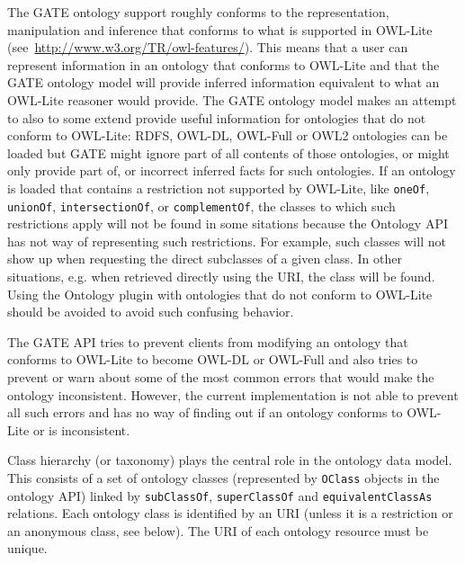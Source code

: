 The GATE ontology support roughly conforms to the representation, 
manipulation and inference that conforms to what is supported in
OWL-Lite (see~\url{http://www.w3.org/TR/owl-features/}).
This means that a user can represent information in an ontology that
conforms to OWL-Lite and that the GATE ontology model will provide
inferred information equivalent to what an OWL-Lite reasoner 
would provide. The GATE ontology model makes an attempt to also
to some extend provide useful information for ontologies that do
not conform to OWL-Lite: RDFS, OWL-DL, OWL-Full or OWL2 ontologies
can be loaded but GATE might ignore part of all contents of
those ontologies, or might only provide part of, or incorrect 
inferred facts for such ontologies. If an ontology is loaded that 
contains a restriction not supported by OWL-Lite, like \texttt{oneOf},
\texttt{unionOf}, \texttt{intersectionOf}, or \texttt{complementOf},
the classes to which such restrictions apply will not be found in 
some sitations because the Ontology API has not way of representing
such restrictions. For example, such classes will not show up when
requesting the direct subclasses of a given class. In other situations,
e.g. when retrieved directly using the URI, the class will be found.
Using the Ontology plugin with ontologies that do not conform to 
OWL-Lite should be avoided to avoid such confusing behavior.

The GATE API tries to prevent clients from modifying an ontology
that conforms to OWL-Lite to become OWL-DL or OWL-Full and also
tries to prevent or warn about some of the most common errors that
would make the ontology inconsistent. However, the current implementation
is not able to prevent all such errors and has no way of finding out
if an ontology conforms to OWL-Lite or is inconsistent.




Class hierarchy (or taxonomy) plays the central role in the ontology data model. This consists of a set of ontology classes 
(represented by \verb!OClass! objects in the ontology API)
linked by \texttt{subClassOf},
\texttt{superClassOf} and \texttt{equivalentClassAs} relations. Each ontology class 
is identified by an URI 
(unless it is a restriction or an anonymous class, see below).
The URI of each ontology resource must be unique.

